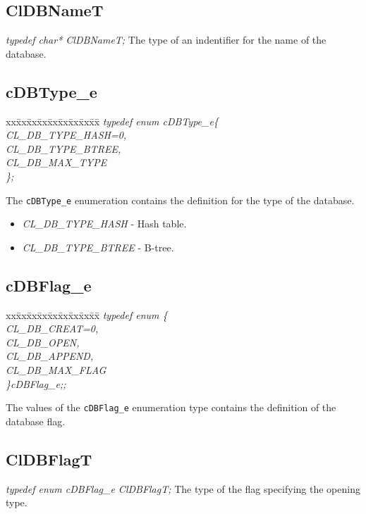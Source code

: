 \begin{flushleft}
\subsection{ClDBNameT}
\textit{typedef char* ClDBNameT;}
\newline
\newline
The type of an indentifier for the name of the database.

\subsection{cDBType\_\-e}
\begin{tabbing}
xx\=xx\=xx\=xx\=xx\=xx\=xx\=xx\=xx\=\kill
\textit{typedef enum cDBType\_e\{}\\
\>\>\>\>\textit{CL\_DB\_TYPE\_HASH=0,}\\
\>\>\>\>\textit{CL\_DB\_TYPE\_BTREE,}\\
\>\>\>\>\textit{CL\_DB\_MAX\_TYPE}\\
\textit{\};}\end{tabbing}
The {\tt {cDBType\_\-e}} enumeration contains the definition for the type of the database.
\begin{itemize}
\item
\textit{CL\_\-DB\_\-TYPE\_\-HASH} - Hash table.
\item
\textit{CL\_\-DB\_\-TYPE\_\-BTREE} - B-tree.
\end{itemize}

\subsection{cDBFlag\_\-e}
\begin{tabbing}
xx\=xx\=xx\=xx\=xx\=xx\=xx\=xx\=xx\=\kill
\textit{typedef enum \{}\\
\>\>\>\>\textit{CL\_DB\_CREAT=0,}\\
\>\>\>\>\textit{CL\_DB\_OPEN,}\\
\>\>\>\>\textit{CL\_DB\_APPEND,}\\
\>\>\>\>\textit{CL\_DB\_MAX\_FLAG}\\
\textit{\}cDBFlag\_e;;}\end{tabbing}
The values of the {\tt{cDBFlag\_\-e}} enumeration type contains the definition of the database flag.


\subsection{ClDBFlagT}
\textit{typedef enum cDBFlag\_\-e ClDBFlagT;}
\newline
\newline
The type of the flag specifying the opening type.



\end{flushleft}
